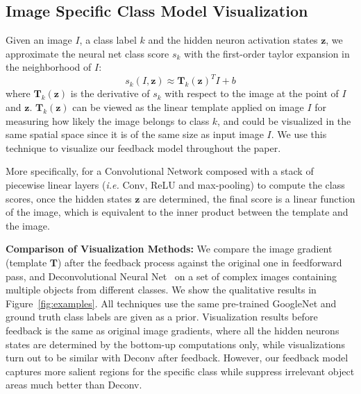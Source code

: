 \subsection{Image Specific Class Model Visualization}
\label{subsec:visualization}
Given an image $I$, a class label $k$ and the hidden neuron activation states $\mathbf{z}$, we approximate the neural net class score $s_k$ with the first-order taylor expansion in the neighborhood of $I$:
\begin{equation}
  s_k(I, \mathbf{z}) \approx  \mathbf{T}_k(\mathbf{z})^T I + b
\end{equation}
where $\mathbf{T}_k(\mathbf{z})$ is the derivative of $s_k$ with respect to the image at the point of $I$ and $\mathbf{z}$. $\mathbf{T}_k(\mathbf{z})$ can be viewed as the linear template applied on image $I$ for measuring how likely the image belongs to class $k$, and could be visualized in the same spatial space since it is of the same size as input image $I$.
We use this technique to visualize our feedback model throughout the paper.

More specifically, for a Convolutional Network composed with a stack of piecewise linear layers (\emph{i.e.} Conv, ReLU and max-pooling) to compute the class scores, once the hidden states $\mathbf{z}$ are determined, the final score is a linear function of the image, which is equivalent to the inner product between the template and the image.

\textbf{Comparison of Visualization Methods:} We compare the image gradient (template $\mathbf{T}$) after the feedback process against the original one in feedforward pass, and Deconvolutional Neural Net~\cite{zeiler2014visualizing} on a set of complex images containing multiple objects from different classes. We show the qualitative results in Figure~\ref{fig:examples}. All techniques use the same pre-trained GoogleNet and ground truth class labels are given as a prior. Visualization results before feedback is the same as original image gradients, where all the hidden neurons states are determined by the bottom-up computations only, while visualizations turn out to be similar with Deconv after feedback. However, our feedback model captures more salient regions for the specific class while suppress irrelevant object areas much better than Deconv.

